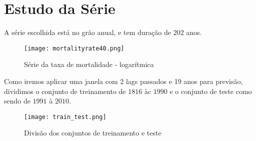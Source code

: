 \documentclass{article}
\begin{document}
\section{Estudo da Série}
A série escolhida está no grão anual, e tem duração de 202 anos.
\begin{figure}[H]
    \centering
    \texttt{[image: mortalityrate40.png]}
    \caption{Série da taxa de mortalidade - logarítmica}
\end{figure}
Como iremos aplicar uma janela com 2 lags passados e 19 anos para previsão, dividimos o conjunto de treinamento de $1816$ àc $1990$ e o conjunto de teste como sendo de $1991$ à $2010$.
\begin{figure}[H]
    \centering
    \texttt{[image: train\_test.png]}
    \caption{Divisão dos conjuntos de treinamento e teste}
\end{figure}
\end{document}
